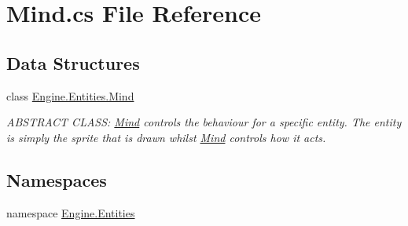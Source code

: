 \hypertarget{a00020}{}\section{Mind.\+cs File Reference}
\label{a00020}
\subsection*{Data Structures}
\begin{DoxyCompactItemize}
\item 
class \hyperlink{a00318}{Engine.\+Entities.\+Mind}
\begin{DoxyCompactList}\small\item\em A\+B\+S\+T\+R\+A\+CT C\+L\+A\+SS\+: \hyperlink{a00318}{Mind} controls the behaviour for a specific entity. The entity is simply the sprite that is drawn whilst \hyperlink{a00318}{Mind} controls how it acts. \end{DoxyCompactList}\end{DoxyCompactItemize}
\subsection*{Namespaces}
\begin{DoxyCompactItemize}
\item 
namespace \hyperlink{a00242}{Engine.\+Entities}
\end{DoxyCompactItemize}
